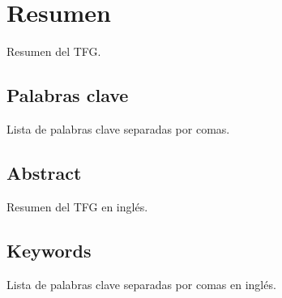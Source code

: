 \chapter*{\centering Resumen}
Resumen del TFG.

\section*{\centering Palabras clave}
Lista de palabras clave separadas por comas.

\blankpage

\begin{otherlanguage}{english}
\chapter*{\centering Abstract}
Resumen del TFG en inglés.

\section*{\centering Keywords}
Lista de palabras clave separadas por comas en inglés.
\end{otherlanguage}

\blankpage